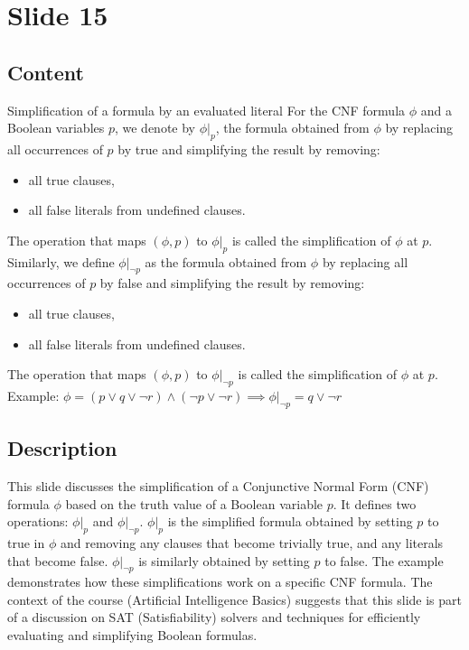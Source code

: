 \documentclass{article}%
\begin{document}
%
\newpage%
\section{Slide 15}%
\label{sec:Slide15}%
\subsection{Content}%

Simplification of a formula by an evaluated literal
For the CNF formula $\phi$ and a Boolean variables $p$, we denote by $\phi |_p$, the formula obtained from $\phi$ by replacing all occurrences of $p$ by true and simplifying the result by removing:
\begin{itemize}
    \item all true clauses,
    \item all false literals from undefined clauses.
\end{itemize}
The operation that maps $(\phi, p)$ to $\phi |_p$ is called the simplification of $\phi$ at $p$.
Similarly, we define $\phi |_{\neg p}$ as the formula obtained from $\phi$ by replacing all occurrences of $p$ by false and simplifying the result by removing:
\begin{itemize}
    \item all true clauses,
    \item all false literals from undefined clauses.
\end{itemize}
The operation that maps $(\phi, p)$ to $\phi |_{\neg p}$ is called the simplification of $\phi$ at $p$.
Example:
$\phi = (p \lor q \lor \neg r) \land (\neg p \lor \neg r) \implies \phi |_{\neg p} = q \lor \neg r$
%
\subsection{Description}%
This slide discusses the simplification of a Conjunctive Normal Form (CNF) formula $\phi$ based on the truth value of a Boolean variable $p$.  It defines two operations: $\phi |_p$ and $\phi |_{\neg p}$.  $\phi |_p$ is the simplified formula obtained by setting $p$ to true in $\phi$ and removing any clauses that become trivially true, and any literals that become false.  $\phi |_{\neg p}$ is similarly obtained by setting $p$ to false.  The example demonstrates how these simplifications work on a specific CNF formula.  The context of the course (Artificial Intelligence Basics) suggests that this slide is part of a discussion on SAT (Satisfiability) solvers and techniques for efficiently evaluating and simplifying Boolean formulas.%
\end{document}

